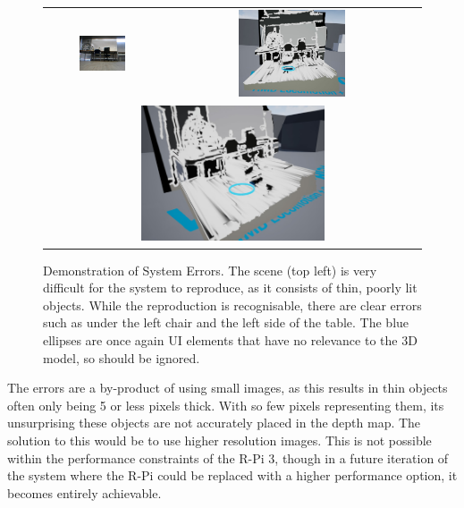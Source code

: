 \begin{figure}[H]
    \begin{center}
    \begin{tabular}{ c c }
        \includegraphics[width=0.43\textwidth,trim={0cm 0 1cm 0},clip]{Figures/TestScene3.jpg} &
        \includegraphics[width=0.43\textwidth]{Figures/TestUnreal3.jpg} \\
        \multicolumn{2}{c}{\includegraphics[width=0.5\textwidth]{Figures/TestUnreal3S.jpg}}
    \end{tabular}
    \caption[Demonstration of System Errors]{Demonstration of System Errors. The scene (top left) is very difficult for the system to reproduce, as it consists of thin, poorly lit objects. While the reproduction is recognisable, there are clear errors such as under the left chair and the left side of the table. The blue ellipses are once again UI elements that have no relevance to the 3D model, so should be ignored.}
    \label{fig:UErrors}
    \end{center}
\end{figure}

The errors are a by-product of using small images, as this results in thin objects often only being 5 or less pixels thick. With so few pixels representing them, its unsurprising these objects are not accurately placed in the depth map. The solution to this would be to use higher resolution images. This is not possible within the performance constraints of the R-Pi 3, though in a future iteration of the system where the R-Pi could be replaced with a higher performance option, it becomes entirely achievable.

